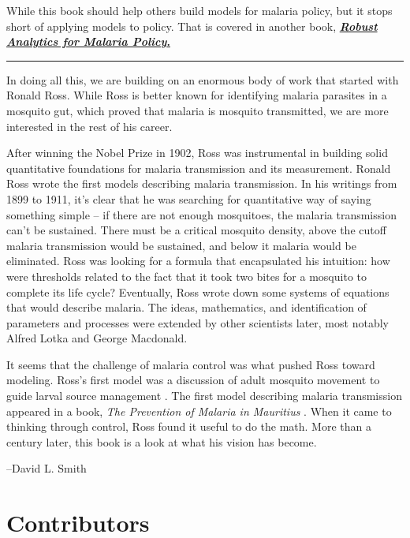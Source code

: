 \documentclass[
]{book}
\begin{document}
While this book should help others build models for malaria policy, but it stops short of applying models to policy. That is covered in another book, \href{../../RAMP-Book/_book/index.html}{\textbf{\emph{Robust Analytics for Malaria Policy}.}}

\begin{center}\rule{0.5\linewidth}{0.5pt}\end{center}

In doing all this, we are building on an enormous body of work that started with Ronald Ross. While Ross is better known for identifying malaria parasites in a mosquito gut, which proved that malaria is mosquito transmitted, we are more interested in the rest of his career.

After winning the Nobel Prize in 1902, Ross was instrumental in building solid quantitative foundations for malaria transmission and its measurement. Ronald Ross wrote the first models describing malaria transmission. In his writings from 1899 to 1911, it's clear that he was searching for quantitative way of saying something simple -- if there are not enough mosquitoes, the malaria transmission can't be sustained. There must be a critical mosquito density, above the cutoff malaria transmission would be sustained, and below it malaria would be eliminated. Ross was looking for a formula that encapsulated his intuition: how were thresholds related to the fact that it took two bites for a mosquito to complete its life cycle? Eventually, Ross wrote down some systems of equations that would describe malaria. The ideas, mathematics, and identification of parameters and processes were extended by other scientists later, most notably Alfred Lotka and George Macdonald.

It seems that the challenge of malaria control was what pushed Ross toward modeling. Ross's first model was a discussion of adult mosquito movement to guide larval source management \autocite{RossR1905LogicalBasis}. The first model describing malaria transmission appeared in a book, \emph{The Prevention of Malaria in Mauritius} \autocite{RossR1908}. When it came to thinking through control, Ross found it useful to do the math. More than a century later, this book is a look at what his vision has become.

--David L. Smith

\section*{Contributors}\label{contributors}
\end{document}
